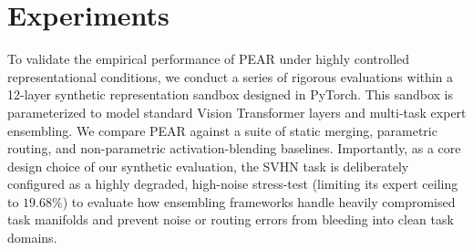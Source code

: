 \section{Experiments}
\label{sec:experiments}

To validate the empirical performance of PEAR under highly controlled representational conditions, we conduct a series of rigorous evaluations within a 12-layer synthetic representation sandbox designed in PyTorch. This sandbox is parameterized to model standard Vision Transformer layers and multi-task expert ensembling. We compare PEAR against a suite of static merging, parametric routing, and non-parametric activation-blending baselines. Importantly, as a core design choice of our synthetic evaluation, the SVHN task is deliberately configured as a highly degraded, high-noise stress-test (limiting its expert ceiling to $19.68\%$) to evaluate how ensembling frameworks handle heavily compromised task manifolds and prevent noise or routing errors from bleeding into clean task domains.

